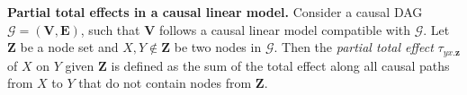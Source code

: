 \documentclass[11pt,a4paper]{article}
\newtheorem{Lemma}[Satz]{Lemma}
\newtheorem{Theorem}[Satz]{Theorem}
\theoremstyle{definition}
\theoremstyle{remark}
\newcommand{\mpdag}{maximal PDAG}
\newcommand{\g}[1][G]{\mathcal{#1}}
\newcommand{\vsp}{\vspace{.2cm}}
\begin{document}
\vsp

\noindent{}\textbf{Partial total effects in a causal linear model.} Consider a causal DAG $\g=(\mathbf{V},\mathbf{E})$, such that $\mathbf{V}$ follows a causal linear model compatible with $\g$. Let $\mathbf{Z}$ be a node set and $X,Y \notin \mathbf{Z}$ be two nodes in $\g$. Then the \emph{partial total effect} $\tau_{yx.\mathbf{z}}$ of $X$ on $Y$ given $\mathbf{Z}$ is defined as the sum of the total effect along all causal paths from $X$ to $Y$ that do not contain nodes from $\mathbf{Z}$.







%

\end{document}
